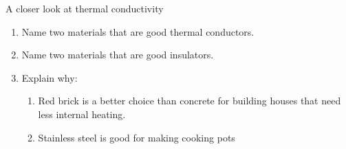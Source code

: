 \begin{Investigation}{A closer look at thermal conductivity}
{      \label{m38706*id67013}\begin{enumerate}[noitemsep, label=\textbf{\arabic*}. ] 
            \label{m38706*uid105}\item Name two materials that are good thermal conductors.
\label{m38706*uid106}\item Name two materials that are good insulators.
\label{m38706*uid107}\item Explain why:
\label{m38706*id67053}\begin{enumerate}[noitemsep, label=\textbf{\alph*}. ] 
            \label{m38706*uid108}\item Red brick is a better choice than concrete for building houses that need less internal heating. 
\label{m38706*uid109}\item Stainless steel is good for making cooking pots
\end{enumerate}
        \end{enumerate}}
\end{Investigation}
\label{m38706*notfhsst!!!underscore!!!id564}
	\par
    \label{m38706*cid8}

